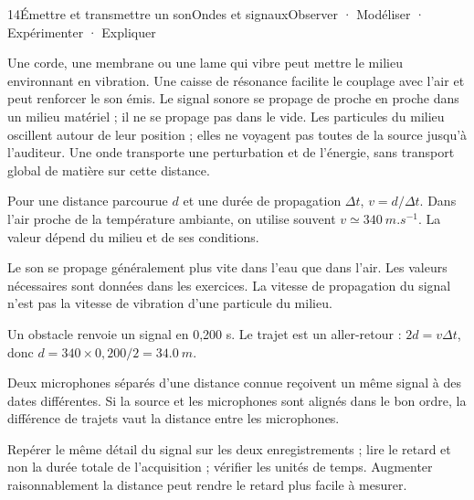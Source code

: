 \begin{ouverture}[son]{14}{Émettre et transmettre un son}{Ondes et signaux}{Observer · Modéliser · Expérimenter · Expliquer}
\end{ouverture}
\essentiel
{}
Une corde, une membrane ou une lame qui vibre peut mettre le milieu environnant en vibration. Une caisse de résonance facilite le couplage avec l'air et peut renforcer le son émis. Le signal sonore se propage de proche en proche dans un milieu matériel ; il ne se propage pas dans le vide.
Les particules du milieu oscillent autour de leur position ; elles ne voyagent pas toutes de la source jusqu'à l'auditeur. Une onde transporte une perturbation et de l'énergie, sans transport global de matière sur cette distance.
\begin{loi}Pour une distance parcourue $d$ et une durée de propagation $\Delta t$, $v=d/\Delta t$. Dans l'air proche de la température ambiante, on utilise souvent $v\simeq\qty{340}{m.s^{-1}}$. La valeur dépend du milieu et de ses conditions.\end{loi}
Le son se propage généralement plus vite dans l'eau que dans l'air. Les valeurs nécessaires sont données dans les exercices. La vitesse de propagation du signal n'est pas la vitesse de vibration d'une particule du milieu.
\begin{exemple}[Un écho]Un obstacle renvoie un signal en 0,200 s. Le trajet est un aller-retour : $2d=v\Delta t$, donc $d=340\times0,200/2=\qty{34,0}{m}$.\end{exemple}
Deux microphones séparés d'une distance connue reçoivent un même signal à des dates différentes. Si la source et les microphones sont alignés dans le bon ordre, la différence de trajets vaut la distance entre les microphones.
\begin{savoirfaire}Repérer le même détail du signal sur les deux enregistrements ; lire le retard et non la durée totale de l'acquisition ; vérifier les unités de temps. Augmenter raisonnablement la distance peut rendre le retard plus facile à mesurer.\end{savoirfaire}
